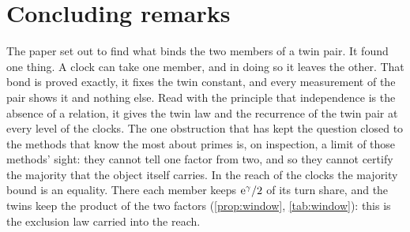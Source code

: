 \documentclass[11pt]{article}
\theoremstyle{definition}\newtheorem{definition}[theorem]{Definition}
\theoremstyle{remark}\newtheorem{remark}[theorem]{Remark}
\begin{document}
\section{Concluding remarks}\label{sec:concl}
The paper set out to find what binds the two members of a twin pair. It found one thing. A clock can take one member, and in doing so it leaves the other. That bond is proved exactly, it fixes the twin constant, and every measurement of the pair shows it and nothing else. Read with the principle that independence is the absence of a relation, it gives the twin law and the recurrence of the twin pair at every level of the clocks. The one obstruction that has kept the question closed to the methods that know the most about primes is, on inspection, a limit of those methods' sight: they cannot tell one factor from two, and so they cannot certify the majority that the object itself carries. In the reach of the clocks the majority bound is an equality. There each member keeps $\mathrm e^\gamma/2$ of its turn share, and the twins keep the product of the two factors (\cref{prop:window}, \cref{tab:window}): this is the exclusion law carried into the reach.
\end{document}
